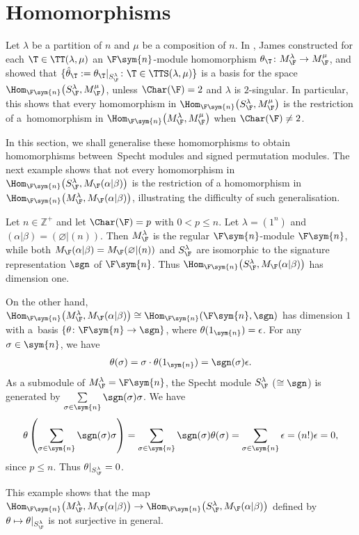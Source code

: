 \section{Homomorphisms}\label{S:sstd hom}

Let $\lambda$ be a partition of $n$ and $\mu$ be a composition of $n$. In \cite[Section~13]{GJ}, James constructed for each $\T \in \TT(\lambda,\mu)$ an $\F\sym{n}$-module homomorphism $\theta_\T \colon M_\F^{\lambda} \to M_\F^{\mu}$, and showed that $\{ \hat{\theta}_{\T} := \theta_{\T}|_{S_\F^{\lambda}}\colon \T \in \TTS(\lambda,\mu) \}$ is a basis for the space $\Hom_{\F\sym{n}}\big(S_\F^{\lambda},M_\F^{\mu}\big)$, unless $\Char(\F)=2$ and $\lambda$ is $2$-singular. In particular, this shows that every homomorphism in $\Hom_{\F\sym{n}}\big(S_\F^{\lambda},M_\F^{\mu}\big)$ is the restriction of a~homomorphism in $\Hom_{\F\sym{n}}\big(M_\F^{\lambda},M_\F^{\mu}\big)$ when $\Char(\F)\neq 2$.

In this section, we shall generalise these homomorphisms to obtain homomorphisms between~Specht modules and signed permutation modules. The next example shows that not every homomor\-phism in $\Hom_{\F\sym{n}}\big(S_\F^{\lambda},M_\F(\alpha|\beta)\big)$ is the restriction of a homomorphism in \linebreak $\Hom_{\F\sym{n}}\big(M_\F^{\lambda},M_\F(\alpha|\beta)\big)$, illustrating the difficulty of such generalisation.

\begin{Example}\label{Eg: James res}
Let $n\in \mathbb{Z}^+$ and let $\Char(\F)=p$ with $0 < p \leq n$. Let $\lambda=(1^n)$ and $(\alpha|\beta)=(\varnothing|(n))$. Then $M_\F^\lambda$ is the regular $\F\sym{n}$-module $\F\sym{n}$, while both $M_\F(\alpha|\beta)=M_\F(\varnothing|(n))$ and $S_\F^\lambda$ are isomorphic to the signature representation $\sgn$ of $\F\sym{n}$. Thus $\Hom_{\F\sym{n}}\big(S_\F^\lambda,M_\F(\alpha|\beta)\big)$ has dimension one.

On the other hand, $\Hom_{\F\sym{n}}\big(M_\F^\lambda,M_\F(\alpha|\beta)\big) \cong \Hom_{\F\sym{n}}(\F\sym{n},\sgn)$ has dimension $1$ with a~basis $\{\theta\colon \F\sym{n} \to \sgn \}$, where $\theta(1_{\sym{n}})=\epsilon$. For any $\sigma\in \sym{n}$, we have
\begin{gather*}
\theta(\sigma)=\sigma \cdot \theta(1_{\sym{n}})=\sgn(\sigma) \epsilon.
\end{gather*}
As a submodule of $M_\F^{\lambda} = \F\sym{n}$, the Specht module $S_\F^{\lambda}$ ($\cong \sgn$) is generated by $\sum\limits_{\sigma \in \sym{n}} \sgn(\sigma) \sigma$. We have
\begin{gather*}
\theta\left (\sum_{\sigma\in\sym{n}}\sgn(\sigma)\sigma\right )=\sum_{\sigma\in\sym{n}}\sgn(\sigma)\theta(\sigma)=\sum_{\sigma\in\sym{n}} \epsilon = (n!) \epsilon = 0,
\end{gather*}
since $p \leq n$. Thus $\theta|_{S_\F^\lambda} = 0$.

This example shows that the map $\Hom_{\F\sym{n}} \big(M_\F^{\lambda}, M_\F(\alpha|\beta)\big) \to \Hom_{\F\sym{n}} \big(S_\F^{\lambda}, M_\F(\alpha|\beta)\big)$ defined by $\theta \mapsto \theta|_{S_\F^{\lambda}}$ is not surjective in general.
\end{Example}

